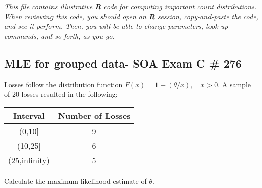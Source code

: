 \documentclass[]{book}
\newenvironment{Shaded}{\begin{snugshade}}{\end{snugshade}}
\newcommand{\KeywordTok}[1]{\textcolor[rgb]{0.13,0.29,0.53}{\textbf{#1}}}
\newcommand{\DataTypeTok}[1]{\textcolor[rgb]{0.13,0.29,0.53}{#1}}
\newcommand{\DecValTok}[1]{\textcolor[rgb]{0.00,0.00,0.81}{#1}}
\newcommand{\StringTok}[1]{\textcolor[rgb]{0.31,0.60,0.02}{#1}}
\newcommand{\CommentTok}[1]{\textcolor[rgb]{0.56,0.35,0.01}{\textit{#1}}}
\newcommand{\OtherTok}[1]{\textcolor[rgb]{0.56,0.35,0.01}{#1}}
\newcommand{\ControlFlowTok}[1]{\textcolor[rgb]{0.13,0.29,0.53}{\textbf{#1}}}
\newcommand{\OperatorTok}[1]{\textcolor[rgb]{0.81,0.36,0.00}{\textbf{#1}}}
\newcommand{\NormalTok}[1]{#1}
\theoremstyle{definition}
\theoremstyle{definition}
\theoremstyle{definition}
\theoremstyle{remark}
\begin{document}
\emph{This file contains illustrative \textbf{R} code for computing
important count distributions. When reviewing this code, you should open
an \textbf{R} session, copy-and-paste the code, and see it perform.
Then, you will be able to change parameters, look up commands, and so
forth, as you go. }

\subsection{MLE for grouped data- SOA Exam C \#
276}\label{mle-for-grouped-data--soa-exam-c-276}

Losses follow the distribution function \(F(x)=1-(\theta/x),\quad x>0\).
A sample of 20 losses resulted in the following:

\begin{longtable}[]{@{}cc@{}}
\toprule
Interval & Number of Losses\tabularnewline
\midrule
\endhead
(0,10{]} & 9\tabularnewline
(10,25{]} & 6\tabularnewline
(25,infinity) & 5\tabularnewline
\bottomrule
\end{longtable}

Calculate the maximum likelihood estimate of \(\theta\).

\begin{Shaded}
\end{Shaded}
\end{document}
